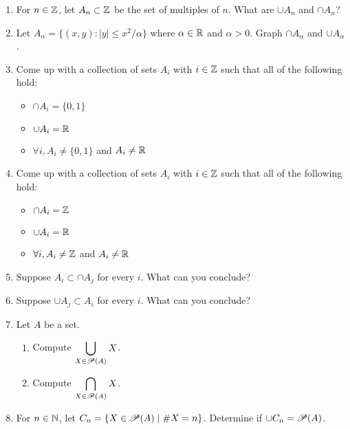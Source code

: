 \begin{enumerate}
    \item For $n \in \mathbb{Z}$, let $A_n \subset \mathbb{Z}$ be the set of multiples of $n$. What are $\cup A_n$ and $\cap A_n$?

    \item Let $A_\alpha = \{(x,y): |y| \leq x^2/\alpha\}$ where $\alpha \in \mathbb{R}$ and $\alpha > 0$. Graph $\cap A_\alpha$ and $\cup A_\alpha$.

    \item Come up with a collection of sets $A_i$ with $i \in \mathbb{Z}$ such that all of the following hold:
  \begin{itemize}
      \item $\cap A_i = \{0, 1\}$
      \item $\cup A_i = \mathbb{R}$
      \item $\forall i, A_i \neq \{0, 1\}$ and $A_i \neq \mathbb{R}$
  \end{itemize}

    \item Come up with a collection of sets $A_i$ with $i \in \mathbb{Z}$ such that all of the following hold:
  \begin{itemize}
      \item $\cap A_i = \mathbb{Z}$
      \item $\cup A_i = \mathbb{R}$
      \item $\forall i, A_i \neq \mathbb{Z}$ and $A_i \neq \mathbb{R}$
  \end{itemize}

    \item Suppose $A_i \subset \cap A_j$ for every $i$. What can you conclude?

    \item Suppose $\cup A_j \subset A_i$ for every $i$. What can you conclude?

    \item Let $A$ be a set. 
  \begin{enumerate}
      \item Compute $\displaystyle\bigcup_{X \in \mathscr{P}(A)} X$. 
      \item Compute $\displaystyle\bigcap_{X \in \mathscr{P}(A)} X$.
  \end{enumerate}

    \item For $n \in \mathbb{N}$, let $C_n = \{X \in \mathscr{P}(A) \mid \# X = n\}$. Determine if $\cup C_n = \mathscr{P}(A)$.


\end{enumerate}
